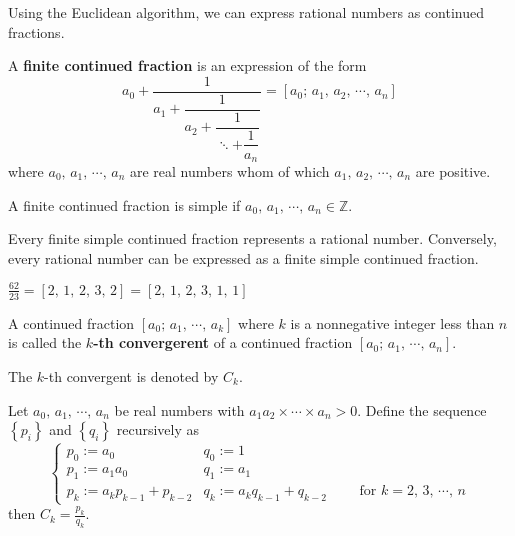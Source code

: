 Using the Euclidean algorithm, we can express rational numbers
as continued fractions.

\begin{definition}
    A \textbf{finite continued fraction} is an expression of the form
    \[
        a_0 + \dfrac{1}{a_1 + \dfrac{1}{a_2 + \dfrac{1}{\ddots + \dfrac{1}{a_n}}}}
        = \left[a_0;\,a_1,\,a_2,\,\cdots,\,a_n\right]
    \]
    where $a_0,\,a_1,\,\cdots,\,a_n$ are real numbers whom of which
    $a_1,\,a_2,\,\cdots,\,a_n$ are positive.
    
    A finite continued fraction is simple if $a_0,\,a_1,\,\cdots,\,a_n \in \mathbb{Z}$.
\end{definition}

\begin{theorem}
    Every finite simple continued fraction represents a rational number.
    Conversely, every rational number can be expressed as a finite simple
    continued fraction.
\end{theorem}

\begin{remark}
    $\frac{62}{23} = \left[2,\,1,\,2,\,3,\,2\right] = \left[2,\,1,\,2,\,3,\,1,\,1\right]$
\end{remark}

\begin{definition}
    A continued fraction $\left[a_0;\,a_1,\,\cdots,\,a_k\right]$
    where $k$ is a nonnegative integer less than $n$ is called the
    \textbf{$k$-th convergerent} of a continued fraction $\left[a_0;\,a_1,\,\cdots,\,a_n\right]$.

    The $k$-th convergent is denoted by $C_k$.
\end{definition}

\begin{theorem}
    Let $a_0,\,a_1,\,\cdots,\,a_n$ be real numbers with $a_1 a_2 \times\cdots\times a_n > 0$.
    Define the sequence $\left\{p_i\right\}$ and $\left\{q_i\right\}$ 
    recursively as
    \[
        \begin{cases}
            p_0 := a_0 & q_0 := 1 \\
            p_1 := a_1a_0 & q_1 := a_1 \\
            p_k := a_kp_{k-1} + p_{k-2} & q_k := a_k q_{k-1} + q_{k-2} \qquad \mbox{ for } k = 2,\,3,\,\cdots,\,n
        \end{cases}
    \]
    then $C_k = \frac{p_k}{q_k}$.
\end{theorem}